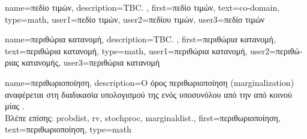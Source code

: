 {name={\foreignlanguage{greek}{πεδίο τιμών}}, 
	description={TBC. },
	first={\foreignlanguage{greek}{πεδίο τιμών}},
	text={co-domain},
	type=math,
	user1={\foreignlanguage{greek}{πεδίο τιμών}}, %
  	user2={\foreignlanguage{greek}{πεδίου τιμών}}, %
	user3={\foreignlanguage{greek}{πεδίο τιμών}} %
}

{name={\foreignlanguage{greek}{περιθώρια κατανομή}}, 
	description={TBC. },
	first={\foreignlanguage{greek}{περιθώρια κατανομή}},
	text={\foreignlanguage{greek}{περιθώρια κατανομή}},
	type=math,
	user1={\foreignlanguage{greek}{περιθώρια κατανομή}}, %
  	user2={\foreignlanguage{greek}{περιθώριας κατανομής}}, %
	user3={\foreignlanguage{greek}{περιθώρια κατανομή}} %
}

{name={\foreignlanguage{greek}{περιθωριοποίηση}}, 
	description={\foreignlanguage{greek}{Ο όρος περιθωριοποίηση} (marginalization) 
		\foreignlanguage{greek}{αναφέρεται στη διαδικασία υπολογισμού της}  
		\foreignlanguage{greek}{ενός υποσυνόλου}  \foreignlanguage{greek}{από την από κοινού}  
		\foreignlanguage{greek}{μίας}  \cite{GraphModExpFamVarInfWainJor}.
		\\
		\foreignlanguage{greek}{Βλέπε επίσης:} \gls{probdist}, \gls{rv}, \gls{stochproc}, \gls{marginaldist}.},
	first={\foreignlanguage{greek}{περιθωριοποίηση}},
	text={\foreignlanguage{greek}{περιθωριοποίηση}},
	type=math
}

